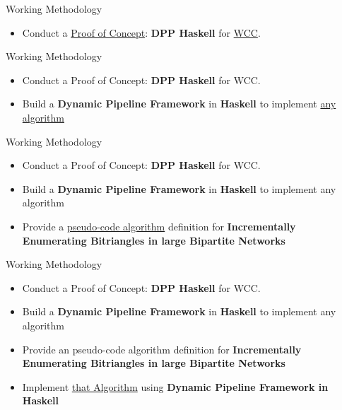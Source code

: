 
\begin{frame}[fragile]{Working Methodology}
  \begin{itemize}
    \item Conduct a \underline{\color{red}Proof of Concept}: \textbf{DPP Haskell} for \underline{\color{red}WCC}.
  \end{itemize}   
\end{frame}

\begin{frame}[fragile]{Working Methodology}
    \begin{itemize}
      \setlength\itemsep{1.5em}
      \item {\color{light}Conduct a Proof of Concept: \textbf{DPP Haskell} for WCC.}
      \item Build a \textbf{Dynamic Pipeline Framework} in \textbf{Haskell} to implement \underline{\color{red}any algorithm}
  \end{itemize}   
\end{frame}

\begin{frame}[fragile]{Working Methodology}
    \begin{itemize}
      \setlength\itemsep{1.5em}
      \item {\color{light}Conduct a Proof of Concept: \textbf{DPP Haskell} for WCC.}
      \item {\color{light}Build a \textbf{Dynamic Pipeline Framework} in \textbf{Haskell} to implement any algorithm }
      \item Provide a \underline{\color{red}pseudo-code algorithm} definition for \textbf{Incrementally Enumerating Bitriangles in large Bipartite Networks}
  \end{itemize}   
\end{frame}

\begin{frame}[fragile]{Working Methodology}
    \begin{itemize}
      \setlength\itemsep{1.5em}
      \item {\color{light}Conduct a Proof of Concept: \textbf{DPP Haskell} for WCC.}
      \item {\color{light}Build a \textbf{Dynamic Pipeline Framework} in \textbf{Haskell} to implement any algorithm }
      \item {\color{light}Provide an pseudo-code algorithm definition for \textbf{Incrementally Enumerating Bitriangles in large Bipartite Networks}}
      \item Implement \underline{\color{red}that Algorithm} using \textbf{Dynamic Pipeline Framework in Haskell}
  \end{itemize}   
\end{frame}


